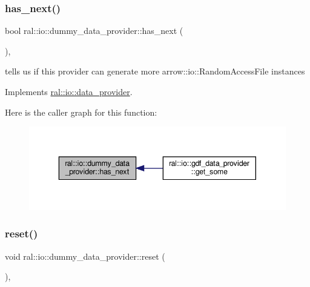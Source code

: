 \mbox{\label{classral_1_1io_1_1dummy__data__provider_a18a1c55f0a6042dfa5edc6bc0235b518}} 
\subsubsection{\texorpdfstring{has\+\_\+next()}{has\_next()}}
{\footnotesize\ttfamily bool ral\+::io\+::dummy\+\_\+data\+\_\+provider\+::has\+\_\+next (\begin{DoxyParamCaption}{ }\end{DoxyParamCaption})\hspace{0.3cm}{\ttfamily [inline]}, {\ttfamily [virtual]}}

tells us if this provider can generate more arrow\+::io\+::\+Random\+Access\+File instances 

Implements \hyperlink{classral_1_1io_1_1data__provider_a92176228bbef65093853e2e2165a6d71}{ral\+::io\+::data\+\_\+provider}.

Here is the caller graph for this function\+:\nopagebreak
\begin{figure}[H]
\begin{center}
\leavevmode
\includegraphics[width=343pt]{classral_1_1io_1_1dummy__data__provider_a18a1c55f0a6042dfa5edc6bc0235b518_icgraph}
\end{center}
\end{figure}
\mbox{\label{classral_1_1io_1_1dummy__data__provider_a109b92459b919a31171a6ec00eee0eeb}} 
\subsubsection{\texorpdfstring{reset()}{reset()}}
{\footnotesize\ttfamily void ral\+::io\+::dummy\+\_\+data\+\_\+provider\+::reset (\begin{DoxyParamCaption}{ }\end{DoxyParamCaption})\hspace{0.3cm}{\ttfamily [inline]}, {\ttfamily [virtual]}}

